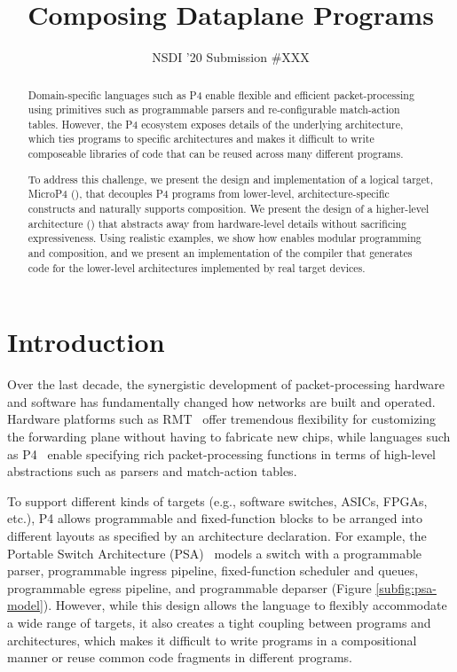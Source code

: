 \documentclass[letterpaper,twocolumn,10pt]{article}
\begin{document}
\date{}
\title{\Large \bf Composing Dataplane Programs}
\author{{\rm NSDI '20 Submission \#XXX}}
\maketitle

\vspace*{-3em}

\begin{abstract}
Domain-specific languages such as P4 enable flexible and efficient
packet-processing using primitives such as programmable parsers and
re-configurable match-action tables. However, the P4 ecosystem exposes
details of the underlying architecture, which ties programs to
specific architectures and makes it difficult to write composeable
libraries of code that can be reused across many different programs.

To address this challenge, we present the design and implementation of
a logical target, MicroP4 (\uswitch), that decouples P4 programs from
lower-level, architecture-specific constructs and naturally supports
composition. We present the design of a higher-level architecture
(\uarch) that abstracts away from hardware-level details without
sacrificing expressiveness. Using realistic examples, we show how
\uswitch enables modular programming and composition, and we present
an implementation of the \ucomp compiler that generates code for the
lower-level architectures implemented by real target devices.
\end{abstract}

\section{Introduction}
\label{sec:intro}
Over the last decade, the synergistic development of packet-processing
hardware and software has fundamentally changed how networks are built
and operated. Hardware platforms such as
RMT~\cite{bosshart2013forwarding} offer tremendous flexibility for
customizing the forwarding plane without having to fabricate new
chips, while languages such as P4~\cite{bosshart2014p4, p4lang} enable
specifying rich packet-processing functions in terms of high-level
abstractions such as parsers and match-action tables.

To support different kinds of targets (e.g., software switches, ASICs,
FPGAs, etc.), P4 allows programmable and fixed-function blocks to be
arranged into different layouts as specified by an architecture
declaration. For example, the Portable Switch Architecture
(PSA)~\cite{psa} models a switch with a programmable parser,
programmable ingress pipeline, fixed-function scheduler and queues,
programmable egress pipeline, and programmable deparser (Figure
\ref{subfig:psa-model}). However, while this design allows the
language to flexibly accommodate a wide range of targets, it also
creates a tight coupling between programs and architectures, which
makes it difficult to write programs in a compositional manner or
reuse common code fragments in different programs.
\end{document}
